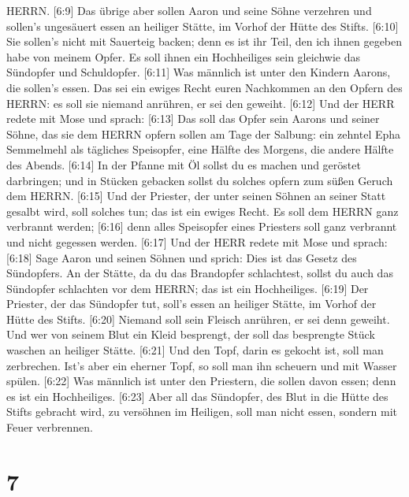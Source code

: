 HERRN.  {[}6:9{]} Das übrige aber sollen Aaron und seine
Söhne verzehren und sollen's ungesäuert essen an heiliger Stätte, im
Vorhof der Hütte des Stifts.  {[}6:10{]} Sie sollen's nicht
mit Sauerteig backen; denn es ist ihr Teil, den ich ihnen gegeben habe
von meinem Opfer. Es soll ihnen ein Hochheiliges sein gleichwie das
Sündopfer und Schuldopfer.  {[}6:11{]} Was männlich ist
unter den Kindern Aarons, die sollen's essen. Das sei ein ewiges Recht
euren Nachkommen an den Opfern des HERRN: es soll sie niemand anrühren,
er sei den geweiht.  {[}6:12{]} Und der HERR redete mit
Mose und sprach:  {[}6:13{]} Das soll das Opfer sein Aarons
und seiner Söhne, das sie dem HERRN opfern sollen am Tage der Salbung:
ein zehntel Epha Semmelmehl als tägliches Speisopfer, eine Hälfte des
Morgens, die andere Hälfte des Abends.  {[}6:14{]} In der
Pfanne mit Öl sollst du es machen und geröstet darbringen; und in
Stücken gebacken sollst du solches opfern zum süßen Geruch dem HERRN.
 {[}6:15{]} Und der Priester, der unter seinen Söhnen an
seiner Statt gesalbt wird, soll solches tun; das ist ein ewiges Recht.
Es soll dem HERRN ganz verbrannt werden;  {[}6:16{]} denn
alles Speisopfer eines Priesters soll ganz verbrannt und nicht gegessen
werden.  {[}6:17{]} Und der HERR redete mit Mose und
sprach:  {[}6:18{]} Sage Aaron und seinen Söhnen und
sprich: Dies ist das Gesetz des Sündopfers. An der Stätte, da du das
Brandopfer schlachtest, sollst du auch das Sündopfer schlachten vor dem
HERRN; das ist ein Hochheiliges.  {[}6:19{]} Der Priester,
der das Sündopfer tut, soll's essen an heiliger Stätte, im Vorhof der
Hütte des Stifts.  {[}6:20{]} Niemand soll sein Fleisch
anrühren, er sei denn geweiht. Und wer von seinem Blut ein Kleid
besprengt, der soll das besprengte Stück waschen an heiliger Stätte.
 {[}6:21{]} Und den Topf, darin es gekocht ist, soll man
zerbrechen. Ist's aber ein eherner Topf, so soll man ihn scheuern und
mit Wasser spülen.  {[}6:22{]} Was männlich ist unter den
Priestern, die sollen davon essen; denn es ist ein Hochheiliges.
 {[}6:23{]} Aber all das Sündopfer, des Blut in die Hütte
des Stifts gebracht wird, zu versöhnen im Heiligen, soll man nicht
essen, sondern mit Feuer verbrennen.

\hypertarget{section-6}{%
\section{7}\label{section-6}}

